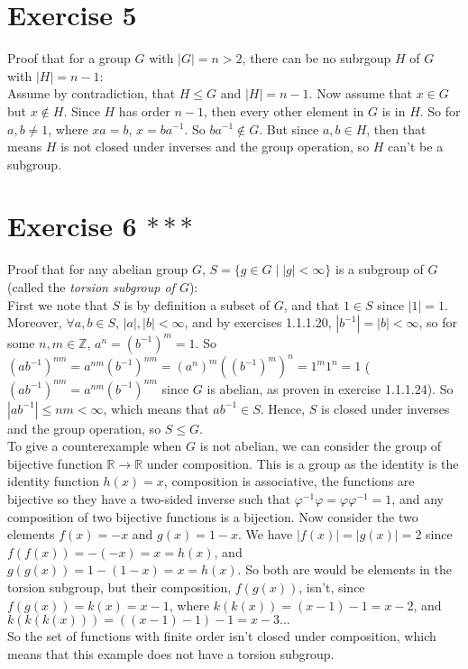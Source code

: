 \documentclass{article}
\newcommand{\Z}{\mathbb{Z}}
\newcommand{\R}{\mathbb{R}}
\begin{document}
    \section*{Exercise 5}
    Proof that for a group $G$ with $|G| = n > 2$,
    there can be no subrgoup $H$ of $G$ with $|H| = n-1$: \\
    Assume by contradiction, that $H \leqslant G$ and $|H| = n-1$.
    Now assume that $x \in G$ but $x \notin H$.
    Since $H$ has order $n - 1$, then every other element in $G$ is in $H$.
    So for $a, b \neq 1$, where $xa = b$, $x = ba^{-1}$.
    So $ba^{-1} \notin G$.
    But since $a, b \in H$,
    then that means $H$ is not closed under inverses and the group operation,
    so $H$ can't be a subgroup.


    \section*{Exercise 6 $***$}
    Proof that for any abelian group $G$,
    $S = \{g \in G \mid |g| < \infty\}$ is a subgroup of $G$
    (called the \textit{torsion subgroup of $G$}): \\
    First we note that $S$ is by definition a subset of $G$,
    and that $1 \in S$ since $|1| = 1$. 
    Moreover, $\forall a, b \in S$, $|a|, |b| < \infty$,
    and by exercises 1.1.1.20, $|b^{-1}| = |b| < \infty$,
    so for some $n, m \in \Z$, $a^n = (b^{-1})^m = 1$.
    So $(ab^{-1})^{nm} = a^{nm}(b^{-1})^{nm}
    = (a^n)^m((b^{-1})^m)^n
    = 1^m1^n
    = 1$
    ($(ab^{-1})^{nm} = a^{nm}(b^{-1})^{nm}$ since $G$ is abelian,
    as proven in exercise 1.1.1.24).
    So $|ab^{-1}| \leqslant nm < \infty$,
    which means that $ab^{-1} \in S$.
    Hence, $S$ is closed under inverses and the group operation,
    so $S \leqslant G$. \\
    To give a counterexample when $G$ is not abelian,
    we can consider the group of bijective function $\R \to \R$
    under composition.
    This is a group as the identity is the identity function $h(x) = x$,
    composition is associative,
    the functions are bijective so they have a two-sided inverse
    such that $\varphi^{-1}\varphi = \varphi\varphi^{-1} = 1$,
    and any composition of two bijective functions is a bijection.
    Now consider the two elements $f(x) = -x$ and $g(x) = 1 - x$.
    We have $|f(x)| = |g(x)| = 2$
    since $f(f(x)) = -(-x) = x = h(x)$,
    and $g(g(x)) = 1 - (1 - x) = x = h(x)$.
    So both are would be elements in the torsion subgroup,
    but their composition, $f(g(x))$, isn't,
    since $f(g(x)) = k(x) = x - 1$, 
    where $k(k(x)) = (x - 1) - 1 = x - 2$,
    and $k(k(k(x))) = ((x - 1) - 1) - 1 = x - 3 \dots$ \\
    So the set of functions with finite order isn't closed under composition,
    which means that this example does not have a torsion subgroup.
\end{document}
